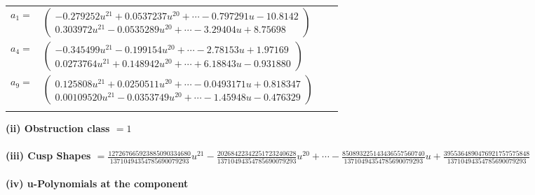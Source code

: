 \documentclass[1p]{elsarticle_modified}
\theoremstyle{definition}
\begin{document}
\begin{tabular}{m{7pt} m{180pt} m{7pt} m{180pt} }
\flushright $a_{1}=$&$\begin{pmatrix}-0.279252 u^{21}+0.0537237 u^{20}+\cdots-0.797291 u-10.8142\\0.303972 u^{21}-0.0535289 u^{20}+\cdots-3.29404 u+8.75698\end{pmatrix}$ \\
\flushright $a_{4}=$&$\begin{pmatrix}-0.345499 u^{21}-0.199154 u^{20}+\cdots-2.78153 u+1.97169\\0.0273764 u^{21}+0.148942 u^{20}+\cdots+6.18843 u-0.931880\end{pmatrix}$ \\
\flushright $a_{9}=$&$\begin{pmatrix}0.125808 u^{21}+0.0250511 u^{20}+\cdots-0.0493171 u+0.818347\\0.00109520 u^{21}-0.0353749 u^{20}+\cdots-1.45948 u-0.476329\end{pmatrix}$\\&\end{tabular}
\flushleft \textbf{(ii) Obstruction class $= 1$}\\~\\
\flushleft \textbf{(iii) Cusp Shapes $= \frac{127267665923885090334680}{13710494354785690079293} u^{21}-\frac{20268422342251723240628}{13710494354785690079293} u^{20}+\cdots-\frac{850893225143436557560740}{13710494354785690079293} u+\frac{3955364890476921757575848}{13710494354785690079293}$}\\~\\
\newpage\renewcommand{\arraystretch}{1}
\flushleft \textbf{(iv) u-Polynomials at the component}\newline \\
\end{document}
